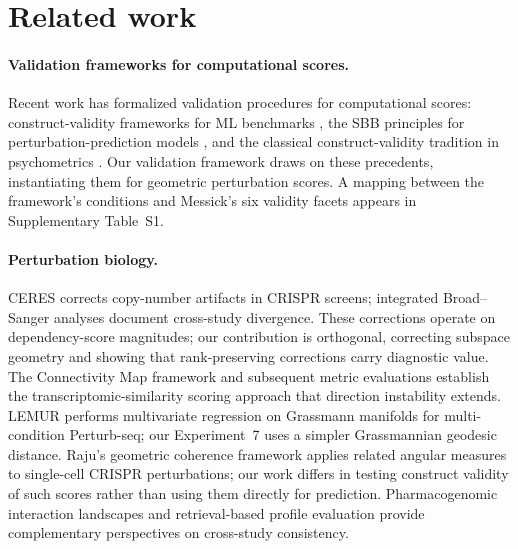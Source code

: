 \documentclass[11pt]{article}
\begin{document}
\section{Related work}

\paragraph{Validation frameworks for computational scores.}
Recent work has formalized validation procedures for computational scores:
construct-validity frameworks for ML benchmarks
\citep{freiesleben2025benchmarking,watson2025measuring}, the SBB
principles for perturbation-prediction models \citep{sbb2026principles},
and the classical construct-validity tradition in psychometrics
\citep{cronbach1955construct,messick1995validity}. Our validation
framework draws on these precedents, instantiating them for geometric
perturbation scores. A mapping between the framework's conditions and
Messick's six validity facets appears in Supplementary Table~S1.

\paragraph{Perturbation biology.}
CERES \citep{meyers2017ceres} corrects copy-number artifacts in CRISPR
screens; integrated Broad--Sanger analyses \citep{pacini2021integrated}
document cross-study divergence. These corrections operate on
dependency-score magnitudes; our contribution is orthogonal, correcting
subspace geometry and showing that rank-preserving corrections carry
diagnostic value. The Connectivity Map framework
\citep{subramanian2017next,lamb2006connectivity} and subsequent metric
evaluations \citep{li2020comprehensive} establish the
transcriptomic-similarity scoring approach that direction instability extends.
LEMUR \citep{ahlmanneltze2025lemur} performs multivariate regression on
Grassmann manifolds for multi-condition Perturb-seq; our Experiment~7 uses
a simpler Grassmannian geodesic distance. Raju's geometric coherence
framework \citep{raju2026shesha} applies related angular measures to
single-cell CRISPR perturbations; our work differs in testing construct
validity of such scores rather than using them directly for prediction.
Pharmacogenomic interaction landscapes \citep{iorio2018unsupervised}
and retrieval-based profile evaluation \citep{kalinin2025versatile}
provide complementary perspectives on cross-study consistency.
\end{document}
